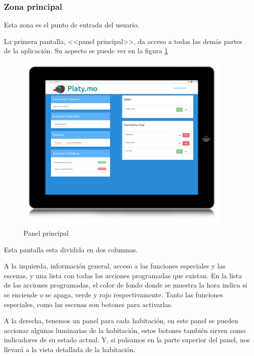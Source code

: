     \subsubsection{Zona principal}
    
    Esta zona es el punto de entrada del usuario. 
    
    La primera pantalla, <<panel principal>>, da acceso a todas las demás partes de la aplicación. Su aspecto se puede ver en la figura \ref{fig:panel_ppal}
    
    \begin{figure}[htbp]
        \centering
        \includegraphics[width=0.95\textwidth]{imagenes/panel_ppal.jpg}
        \caption{Panel principal}
        \label{fig:panel_ppal}
    \end{figure}
    
    Esta pantalla esta dividida en dos columnas.
    
     A la izquierda, información general, acceso a las funciones especiales y las escenas, y una lista con todas las acciones programadas que existan. En la lista de las acciones programadas, el color de fondo donde se muestra la hora indica si se enciende o se apaga, verde y rojo respectivamente. Tanto las funciones especiales, como las escenas son botones para activarlas.
     
     A la derecha, tenemos un panel para cada habitación, en este panel se pueden accionar algunas luminarias de la habitación, estos botones también sirven como indicadores de su estado actual. Y, si pulsamos en la parte superior del panel, nos llevará a la vista detallada de la habitación. 
    
